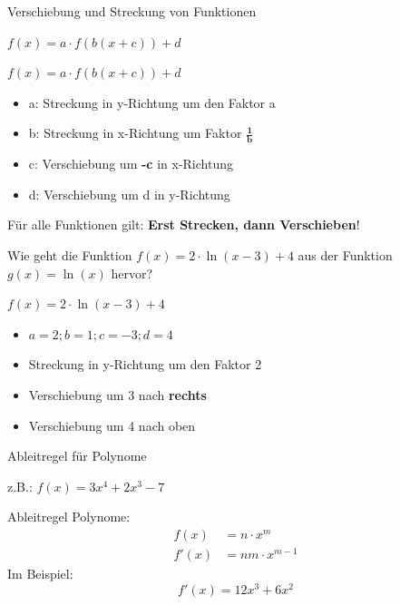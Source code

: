 \documentclass[paper=a6,ngerman,twoside=true,fontsize=14pt, parskip = half]{scrartcl}
\begin{document}
\begin{frage}
	Verschiebung und Streckung von Funktionen  \bigskip
	
	$f(x)=a \cdot f(b(x+c))+d$
\end{frage}
\begin{antwort}
	$f(x)=a \cdot f(b(x+c))+d$
	\begin{itemize}

		\item a: Streckung in y-Richtung um den Faktor a
		\item b: Streckung in x-Richtung um Faktor $\mathbf{\frac{1}{b}}$
		\item c: Verschiebung um \textbf{-c} in x-Richtung
		\item d: Verschiebung um d in y-Richtung
							
	\end{itemize}

	\begin{marked}
		Für alle Funktionen gilt: \center
		\textbf{Erst Strecken, dann Verschieben}!
	\end{marked}

\end{antwort}
\begin{frage}
	Wie geht die Funktion $f(x)=2 \cdot \ln(x-3)+4$ aus der 
	Funktion $g(x)=\ln(x)$ hervor?
\end{frage}
\begin{antwort}
	$f(x)=2 \cdot \ln(x-3)+4$
	\begin{itemize}
		\item $a=2;b=1;c=-3;d=4$
		\item Streckung in y-Richtung um den Faktor 2		
		\item Verschiebung um 3 nach \textbf{rechts}
		\item Verschiebung um 4 nach oben							
	\end{itemize}	
\end{antwort}
\begin{frage}
	Ableitregel für Polynome
	
	z.B.: $f(x)=3x^4+2x^3-7$
	
\end{frage}
\begin{antwort}
	Ableitregel Polynome:
	\begin{align*}
	f(x) &= n \cdot x^m \\
	f'(x) &= nm \cdot x^{m-1}
	\end{align*}
	Im Beispiel:
	\[
	f'(x)=12x^3+6x^2
	\]
\end{antwort}
\end{document}
